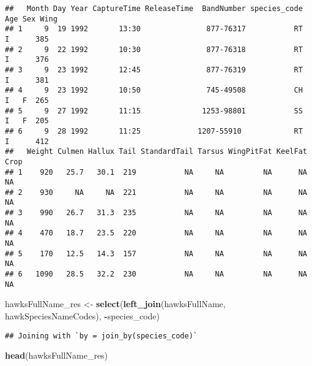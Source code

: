 \documentclass[
]{article}
\newenvironment{Shaded}{\begin{snugshade}}{\end{snugshade}}
\newcommand{\FunctionTok}[1]{\textcolor[rgb]{0.13,0.29,0.53}{\textbf{#1}}}
\newcommand{\NormalTok}[1]{#1}
\newcommand{\OtherTok}[1]{\textcolor[rgb]{0.56,0.35,0.01}{#1}}
\newcommand{\SpecialCharTok}[1]{\textcolor[rgb]{0.81,0.36,0.00}{\textbf{#1}}}
\begin{document}
\begin{verbatim}
##   Month Day Year CaptureTime ReleaseTime  BandNumber species_code Age Sex Wing
## 1     9  19 1992       13:30               877-76317           RT   I      385
## 2     9  22 1992       10:30               877-76318           RT   I      376
## 3     9  23 1992       12:45               877-76319           RT   I      381
## 4     9  23 1992       10:50               745-49508           CH   I   F  265
## 5     9  27 1992       11:15              1253-98801           SS   I   F  205
## 6     9  28 1992       11:25             1207-55910            RT   I      412
##   Weight Culmen Hallux Tail StandardTail Tarsus WingPitFat KeelFat Crop
## 1    920   25.7   30.1  219           NA     NA         NA      NA   NA
## 2    930     NA     NA  221           NA     NA         NA      NA   NA
## 3    990   26.7   31.3  235           NA     NA         NA      NA   NA
## 4    470   18.7   23.5  220           NA     NA         NA      NA   NA
## 5    170   12.5   14.3  157           NA     NA         NA      NA   NA
## 6   1090   28.5   32.2  230           NA     NA         NA      NA   NA
\end{verbatim}

\begin{Shaded}
\begin{Highlighting}[]
\NormalTok{hawksFullName\_res }\OtherTok{\textless{}{-}} \FunctionTok{select}\NormalTok{(}\FunctionTok{left\_join}\NormalTok{(hawksFullName, hawkSpeciesNameCodes), }\SpecialCharTok{{-}}\NormalTok{species\_code)}
\end{Highlighting}
\end{Shaded}

\begin{verbatim}
## Joining with `by = join_by(species_code)`
\end{verbatim}

\begin{Shaded}
\begin{Highlighting}[]
\FunctionTok{head}\NormalTok{(hawksFullName\_res)}
\end{Highlighting}
\end{Shaded}
\end{document}
